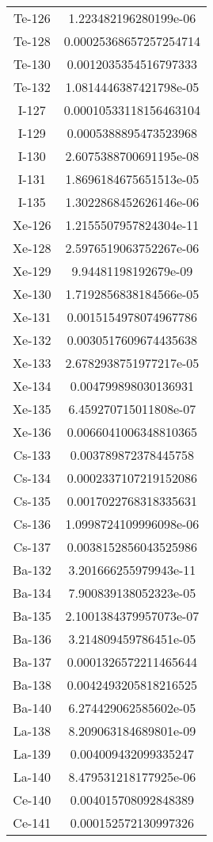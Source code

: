\begin{table}[h!]
\begin{tabular}{|| c || c |}
Te-126 & 1.223482196280199e-06 \\
Te-128 & 0.00025368657257254714 \\
Te-130 & 0.0012035354516797333 \\
Te-132 & 1.0814446387421798e-05 \\
I-127 & 0.00010533118156463104 \\
I-129 & 0.0005388895473523968 \\
I-130 & 2.6075388700691195e-08 \\
I-131 & 1.8696184675651513e-05 \\
I-135 & 1.3022868452626146e-06 \\
Xe-126 & 1.2155507957824304e-11 \\
Xe-128 & 2.5976519063752267e-06 \\
Xe-129 & 9.94481198192679e-09 \\
Xe-130 & 1.7192856838184566e-05 \\
Xe-131 & 0.0015154978074967786 \\
Xe-132 & 0.0030517609674435638 \\
Xe-133 & 2.6782938751977217e-05 \\
Xe-134 & 0.004799898030136931 \\
Xe-135 & 6.459270715011808e-07 \\
Xe-136 & 0.0066041006348810365 \\
Cs-133 & 0.003789872378445758 \\
Cs-134 & 0.0002337107219152086 \\
Cs-135 & 0.0017022768318335631 \\
Cs-136 & 1.0998724109996098e-06 \\
Cs-137 & 0.0038152856043525986 \\
Ba-132 & 3.201666255979943e-11 \\
Ba-134 & 7.900839138052323e-05 \\
Ba-135 & 2.1001384379957073e-07 \\
Ba-136 & 3.214809459786451e-05 \\
Ba-137 & 0.0001326572211465644 \\
Ba-138 & 0.0042493205818216525 \\
Ba-140 & 6.274429062585602e-05 \\
La-138 & 8.209063184689801e-09 \\
La-139 & 0.004009432099335247 \\
La-140 & 8.479531218177925e-06 \\
Ce-140 & 0.004015708092848389 \\
Ce-141 & 0.000152572130997326 \\

\end{tabular}
\end{table}
